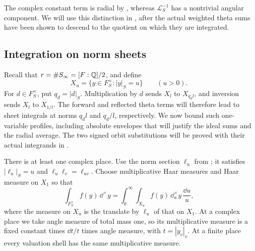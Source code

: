 The complex constant term is radial by , whereas
\(\mathcal L_S^{-1}\) has a nontrivial angular component.  We will use this
distinction in , after the actual weighted theta sums
have been shown to descend to the quotient on which they are integrated.

\subsection{Integration on norm sheets}

Recall that \(r=\#S_\infty=[F:\mathbb{Q}]/2\), and define
\[
 X_u=\{y\in F_S^\times:|y|_S=u\}\qquad(u>0).
\]
For \(d\in F_S^\times\), put \(q_d=|d|_S\).  Multiplication by \(d\)
sends \(X_l\) to \(X_{q_dl}\), and inversion sends \(X_l\) to \(X_{1/l}\).
The forward and reflected theta terms will therefore lead to sheet
integrals at norms \(q_dl\) and \(q_d/l\), respectively.  We now bound
such one-variable profiles, including absolute envelopes that will justify
the ideal sums and the radial average.  The two signed orbit substitutions
will be proved with their actual integrands in .

There is at least one complex place.  Use the norm section \(\ell_u\) from
; it satisfies \(|\ell_u|_S=u\) and
\(\ell_u\ell_v=\ell_{uv}\).  Choose multiplicative Haar measures and Haar
measure on \(X_1\) so that
\begin{equation}\label{eq:sheet-disintegration}
 \int_{F_S^\times}f(y)\,\dd^\times y
 =\int_0^\infty\int_{X_u}f(y)\,\dd^\times_u y\,\frac{\dd u}{u},
\end{equation}
where the measure on \(X_u\) is the translate by \(\ell_u\) of that
on \(X_1\).  At a complex place we take angle measure of total mass
one, so its multiplicative measure is a fixed constant times
\(\dd t/t\) times angle measure, with \(t=|y_v|_v\).
At a finite place every valuation shell has the same multiplicative
measure.


